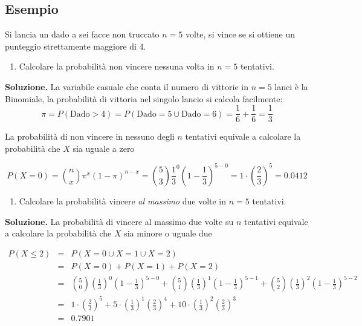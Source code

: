 \documentclass[
  11pt,
]{book}
\providecommand{\tightlist}{%
  \setlength{\itemsep}{0pt}\setlength{\parskip}{0pt}}
\theoremstyle{mytheoremstyle}
\theoremstyle{mydefstyle}
\begin{document}
\subsection{Esempio}\label{esempio}

Si lancia un dado a sei facce non truccato \(n=5\) volte, si vince se si ottiene un punteggio strettamente maggiore di 4.

\begin{enumerate}
\def\labelenumi{\arabic{enumi}.}
\tightlist
\item
  Calcolare la probabilità non vincere nessuna volta in \(n=5\) tentativi.
\end{enumerate}

\textbf{Soluzione.}
La variabile casuale che conta il numero di vittorie in \(n=5\) lanci è la Binomiale, la probabilità di vittoria nel singolo lancio si calcola facilmente:
\[\pi=P(\text{Dado}> 4)=P( \text{Dado}= 5\cup \text{Dado}= 6)=\frac 1 6 +\frac 1 6 =\frac 1 3\]

La probabilità di non vincere in nessuno degli \(n\) tentativi equivale a calcolare la probabilità che \(X\) sia uguale a zero

\[P(X=0)=\binom{n}{ x}\pi^x(1-\pi)^{n-x}=\binom{5}{3}\frac 1 3^0\left(1-\frac 1 3\right)^{5-0}=1\cdot\left({\frac 2 3}\right)^5=0.0412\]

\begin{enumerate}
\def\labelenumi{\arabic{enumi}.}
\setcounter{enumi}{1}
\tightlist
\item
  Calcolare la probabilità vincere \emph{al massimo} due volte in \(n=5\) tentativi.
\end{enumerate}

\textbf{Soluzione.}
La probabilità di vincere al massimo due volte su \(n\) tentativi equivale a calcolare la probabilità che \(X\) sia minore o uguale due

\begin{eqnarray*}
P(X\leq 2) &=& P(X=0\cup X=1 \cup X=2)\\
           &=& P(X=0)+P(X=1)+P(X=2)\\
           &=& \binom{5}{ 0}\left(\frac 1 3\right)^0\left(1-\frac 1 3\right)^{5-0}+
               \binom{5}{ 1}\left(\frac 1 3\right)^1\left(1-\frac 1 3\right)^{5-1}+
               \binom{5}{ 2}\left(\frac 1 3\right)^2\left(1-\frac 1 3\right)^{5-2}\\
           &=& 1\cdot\left({\frac 2 3}\right)^5+5\cdot\left({\frac 1 3}\right)^1\left({\frac 2 3}\right)^4
             +10\cdot\left({\frac 1 3}\right)^2\left({\frac 2 3}\right)^3\\
           &=& 0.7901
\end{eqnarray*}
\end{document}
